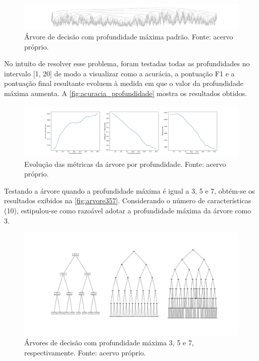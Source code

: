 \documentclass[12pt]{article}
\begin{document}
\begin{figure}[t!]
    \includegraphics[width=\linewidth]{figures/arvore_padrao}
    \caption{Árvore de decisão com profundidade máxima padrão. Fonte: acervo próprio.}
    \label{fig:arvore_padrao}
\end{figure}

No intuito de resolver esse problema, foram testadas todas as profundidades no intervalo [1, 20] de modo a visualizar como a acurácia, a pontuação F1 e a pontuação final resultante evoluem à medida em que o valor da profundidade máxima aumenta. A \autoref{fig:acuracia_profundidade} mostra os resultados obtidos. 

\begin{figure}[t!]
    \includegraphics[width=\linewidth]{figures/acuracia_por_profundidade}
    \caption{Evolução das métricas da árvore por profundidade. Fonte: acervo próprio.}
    \label{fig:acuracia_profundidade}
\end{figure}

Testando a árvore quando a profundidade máxima é igual a 3, 5 e 7, obtém-se os resultados exibidos na \autoref{fig:arvore357}. Considerando o número de características (10), estipulou-se como razoável adotar a profundidade máxima da árvore como 3.

\begin{figure}[t!]
    \includegraphics[width=\linewidth]{figures/arvore_357}
    \caption{Árvores de decisão com profundidade máxima 3, 5 e 7, respectivamente. Fonte: acervo próprio.}
    \label{fig:arvore357}
\end{figure}
\end{document}
